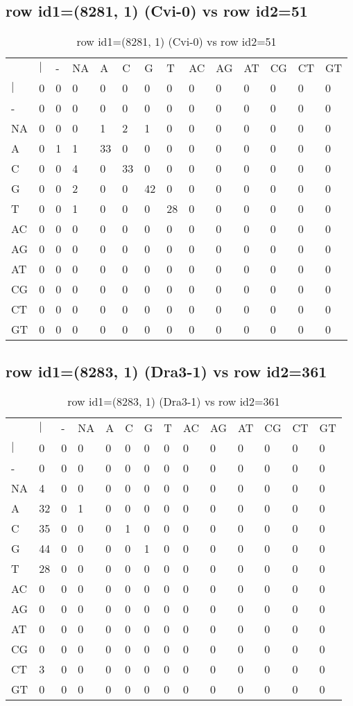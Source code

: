 \subsection{row id1=(8281, 1) (Cvi-0) vs row id2=51}
\begin{center}
\begin{longtable}{|l|l|l|l|l|l|l|l|l|l|l|l|l|l|}
\caption{row id1=(8281, 1) (Cvi-0) vs row id2=51} \label{table_dm440}\\
\hline
\\
\hline
&$|$&-&NA&A&C&G&T&AC&AG&AT&CG&CT&GT\\
$|$&0&0&0&0&0&0&0&0&0&0&0&0&0\\
-&0&0&0&0&0&0&0&0&0&0&0&0&0\\
NA&0&0&0&1&2&1&0&0&0&0&0&0&0\\
A&0&1&1&33&0&0&0&0&0&0&0&0&0\\
C&0&0&4&0&33&0&0&0&0&0&0&0&0\\
G&0&0&2&0&0&42&0&0&0&0&0&0&0\\
T&0&0&1&0&0&0&28&0&0&0&0&0&0\\
AC&0&0&0&0&0&0&0&0&0&0&0&0&0\\
AG&0&0&0&0&0&0&0&0&0&0&0&0&0\\
AT&0&0&0&0&0&0&0&0&0&0&0&0&0\\
CG&0&0&0&0&0&0&0&0&0&0&0&0&0\\
CT&0&0&0&0&0&0&0&0&0&0&0&0&0\\
GT&0&0&0&0&0&0&0&0&0&0&0&0&0\\
\hline
\end{longtable}
\end{center}

\subsection{row id1=(8283, 1) (Dra3-1) vs row id2=361}
\begin{center}
\begin{longtable}{|l|l|l|l|l|l|l|l|l|l|l|l|l|l|}
\caption{row id1=(8283, 1) (Dra3-1) vs row id2=361} \label{table_dm442}\\
\hline
\\
\hline
&$|$&-&NA&A&C&G&T&AC&AG&AT&CG&CT&GT\\
$|$&0&0&0&0&0&0&0&0&0&0&0&0&0\\
-&0&0&0&0&0&0&0&0&0&0&0&0&0\\
NA&4&0&0&0&0&0&0&0&0&0&0&0&0\\
A&32&0&1&0&0&0&0&0&0&0&0&0&0\\
C&35&0&0&0&1&0&0&0&0&0&0&0&0\\
G&44&0&0&0&0&1&0&0&0&0&0&0&0\\
T&28&0&0&0&0&0&0&0&0&0&0&0&0\\
AC&0&0&0&0&0&0&0&0&0&0&0&0&0\\
AG&0&0&0&0&0&0&0&0&0&0&0&0&0\\
AT&0&0&0&0&0&0&0&0&0&0&0&0&0\\
CG&0&0&0&0&0&0&0&0&0&0&0&0&0\\
CT&3&0&0&0&0&0&0&0&0&0&0&0&0\\
GT&0&0&0&0&0&0&0&0&0&0&0&0&0\\
\hline
\end{longtable}
\end{center}

